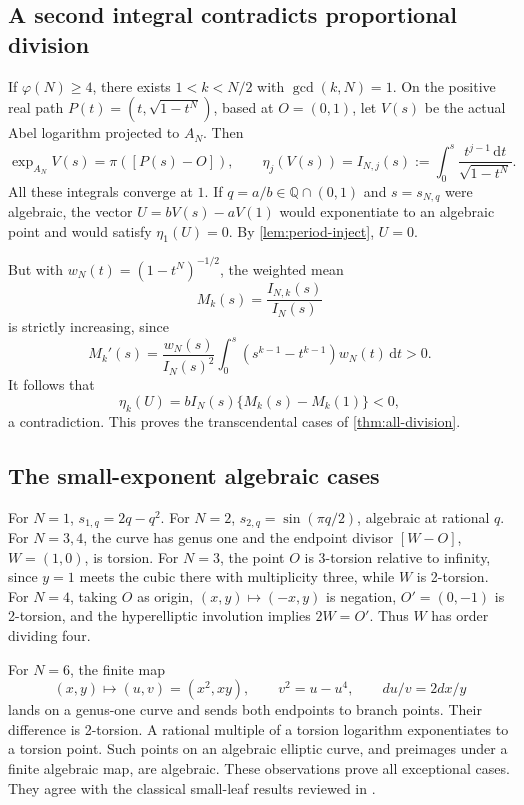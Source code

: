 \documentclass[11pt,a4paper]{article}
\numberwithin{equation}{section}
\theoremstyle{definition}
\theoremstyle{remark}
\newcommand{\Q}{\mathbb Q}
\newcommand{\dd}{\,\mathrm d}
\begin{document}
\subsection{A second integral contradicts proportional division}
If $\varphi(N)\ge4$, there exists
$1<k<N/2$ with $\gcd(k,N)=1$. On the positive real path
$P(t)=(t,\sqrt{1-t^N})$, based at $O=(0,1)$, let $V(s)$ be the actual
Abel logarithm projected to $A_N$. Then
\[
 \exp_{A_N}V(s)=\pi([P(s)-O]),\qquad
 \eta_j(V(s))=I_{N,j}(s):=\int_0^s\frac{t^{j-1}\dd t}{\sqrt{1-t^N}}.
\]
All these integrals converge at $1$. If $q=a/b\in\Q\cap(0,1)$ and
$s=s_{N,q}$ were algebraic, the vector
$U=bV(s)-aV(1)$ would exponentiate to an algebraic point and would satisfy
$\eta_1(U)=0$. By \cref{lem:period-inject}, $U=0$.

But with $w_N(t)=(1-t^N)^{-1/2}$, the weighted mean
\[
 M_k(s)=\frac{I_{N,k}(s)}{I_N(s)}
\]
is strictly increasing, since
\begin{equation}\label{eq:weighted-monotone}
 M_k'(s)=\frac{w_N(s)}{I_N(s)^2}
 \int_0^s(s^{k-1}-t^{k-1})w_N(t)\dd t>0.
\end{equation}
It follows that
\[
 \eta_k(U)=bI_N(s)\{M_k(s)-M_k(1)\}<0,
\]
a contradiction. This proves the transcendental cases of
\cref{thm:all-division}.

\subsection{The small-exponent algebraic cases}
For $N=1$, $s_{1,q}=2q-q^2$. For $N=2$,
$s_{2,q}=\sin(\pi q/2)$, algebraic at rational $q$.
For $N=3,4$, the curve has genus one and the endpoint divisor $[W-O]$,
$W=(1,0)$, is torsion. For $N=3$, the point $O$ is 3-torsion relative to
infinity, since $y=1$ meets the cubic there with multiplicity three, while
$W$ is 2-torsion. For $N=4$, taking $O$ as origin, $(x,y)\mapsto(-x,y)$
is negation, $O'=(0,-1)$ is 2-torsion, and the hyperelliptic involution
implies $2W=O'$. Thus $W$ has order dividing four.

For $N=6$, the finite map
\[
 (x,y)\longmapsto(u,v)=(x^2,xy),\qquad v^2=u-u^4,
 \qquad du/v=2dx/y
\]
lands on a genus-one curve and sends both endpoints to branch points.
Their difference is 2-torsion. A rational multiple of a torsion logarithm
exponentiates to a torsion point. Such points on an algebraic elliptic curve,
and preimages under a finite algebraic map, are algebraic. These observations
prove all exceptional cases. They agree with the classical small-leaf
results reviewed in \cite{Tamiozzo}.
\end{document}
